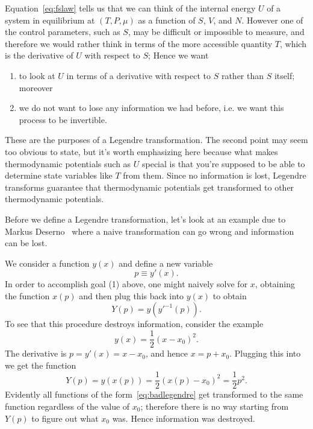 Equation~\eqref{eq:fslaw} tells us that we can think of the internal energy
$U$ of a system in equilibrium at $(T,P,\mu)$ as a function of $S$, $V$, and
$N$. However one of the control parameters, such as $S$, may be
difficult or impossible to measure, and therefore we would rather
think in terms of the more accessible quantity $T$, which 
is the derivative of $U$ with respect to $S$; 
Hence we want 
\begin{enumerate}
\item to look at $U$ in terms of a derivative with respect to $S$ rather 
      than $S$ itself; moreover 
\item we do not want to lose any information we had before, i.e. we want this
      process to be invertible. 
\end{enumerate}
These are the purposes of a Legendre transformation. The second point 
may seem too obvious to state, but it's worth emphasizing here because 
what makes thermodynamic potentials such as $U$ special is that you're 
supposed to be able to determine state variables like $T$ from them. 
Since no information is lost, Legendre transforms guarantee that 
thermodynamic potentials get transformed to other thermodynamic potentials.

Before we define a Legendre transformation, let's look at an example
due to Markus Deserno~\cite{deserno} where a naive transformation can go
wrong and information can be lost. 
\begin{example*}{}
We consider a function $y(x)$ and define a new variable
\begin{equation}\label{eq:xlegendre}
  p\equiv y'(x).
\end{equation}
In order to accomplish goal (1) above, one might naively solve
 for $x$, obtaining the function $x(p)$
and then plug this back into $y(x)$ to obtain
\begin{equation}
  Y(p)=y\left(y'^{-1}(p)\right).
\end{equation}
To see that this procedure destroys information, consider the example
\begin{equation}\label{eq:badlegendre}
  y(x)=\frac{1}{2}(x-x_0)^2.
\end{equation}
The derivative is $p=y'(x)=x-x_0$, and hence $x=p+x_0$. Plugging this
into  we get the function
\begin{equation}
  Y(p)=y(x(p))=\frac{1}{2}\left(x(p)-x_0\right)^2=\frac{1}{2}p^2.
\end{equation}
Evidently all functions of the form~\eqref{eq:badlegendre} get transformed
to the same function regardless of the value of $x_0$; therefore there is
no way starting from $Y(p)$ to figure out what $x_0$ was. Hence
information was destroyed.
\end{example*}

